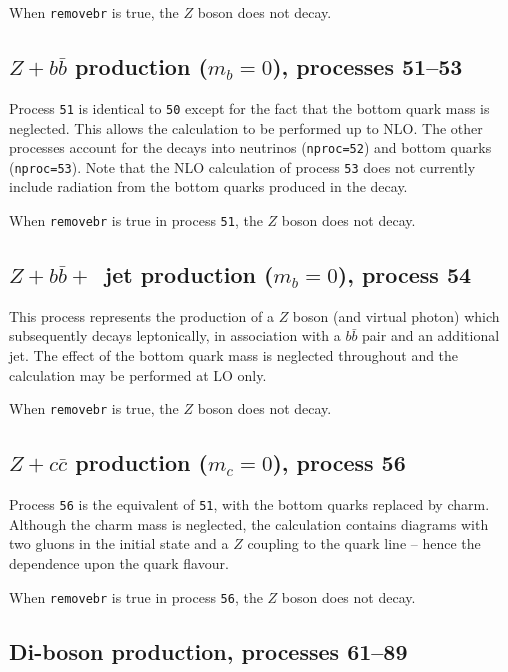 \documentclass[12pt]{article}
\begin{document}
When {\tt removebr} is true, the $Z$ boson does not decay.

\subsection{$Z+b{\bar b}$ production ($m_b=0$), processes 51--53}
\label{subsec:zbbmassless}

Process {\tt 51} is identical to {\tt 50} except for the fact
that the bottom quark mass is neglected. This allows the calculation to be
performed up to NLO. The other processes account for the decays into
neutrinos ({\tt nproc=52}) and bottom quarks ({\tt nproc=53}). Note that
the NLO calculation of process {\tt 53} does not currently 
include radiation from the
bottom quarks produced in the decay.

When {\tt removebr} is true in process {\tt 51}, the $Z$ boson does not decay.

\subsection{$Z+b{\bar b}+$~jet production ($m_b=0$), process 54}
\label{subsec:zbbjetmassless}

This process represents the production of a $Z$ boson (and virtual photon)
which subsequently decays leptonically, in association
with a $b{\bar b}$ pair and an additional jet.
The effect of the bottom quark mass is neglected throughout
and the calculation may be performed at LO only.

When {\tt removebr} is true, the $Z$ boson does not decay.

\subsection{$Z+c{\bar c}$ production ($m_c=0$), process 56}
\label{subsec:zccmassless}

Process {\tt 56} is the equivalent of {\tt 51}, with the bottom quarks
replaced by charm. Although the charm mass is neglected, the calculation
contains diagrams with two gluons in the initial state and a
$Z$ coupling to the quark line -- hence the dependence upon the quark
flavour.

When {\tt removebr} is true in process {\tt 56}, the $Z$ boson does not decay.

\subsection{Di-boson production, processes 61--89}
\label{subsec:diboson}
\end{document}
